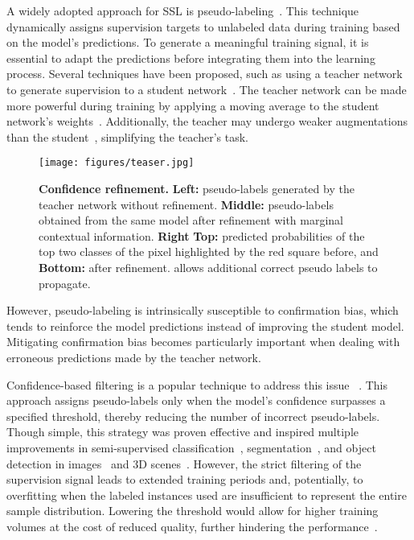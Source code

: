 \documentclass{article}
\renewcommand{\cite}[1]{\citep{#1}}
\begin{document}
A widely adopted approach for SSL is pseudo-labeling~\cite{lee2013pseudolabel,Arazo2020PseudoLabelingAC}. This technique dynamically assigns supervision targets to unlabeled data during training based on the model's predictions.  To generate a meaningful training signal, it is essential to adapt the predictions before integrating them into the learning process. Several techniques have been proposed, such as using a teacher network to generate supervision to a student network~\cite{hinton2015distilling}. The teacher network can be made more powerful during training by applying a moving average to the student network's weights~\cite{tarvainen2017meanteacher}. Additionally, the teacher may undergo weaker augmentations than the student~\cite{berthelot2019mixmatch}, simplifying the teacher's task.

\begin{figure}
	\centering	\texttt{[image: figures/teaser.jpg]} 
 \vspace{-.1cm}
	\caption{
 \textbf{Confidence refinement.} \textbf{Left:} pseudo-labels generated by the teacher network without refinement. \textbf{Middle:} pseudo-labels obtained from the same model after refinement with marginal contextual information. \textbf{Right} \textbf{Top:} predicted probabilities of the top two classes of the pixel highlighted by the red square before, and \textbf{Bottom:}  after refinement. \methodname{} allows additional correct pseudo labels to propagate.}
 \vspace{-0.5cm}
	\label{fig:teaser}
\end{figure}

However, pseudo-labeling is intrinsically susceptible to confirmation bias, which tends to reinforce the model predictions instead of improving the student model. Mitigating confirmation bias becomes particularly important when dealing with erroneous predictions made by the teacher network.

Confidence-based filtering is a popular technique to address this issue ~\cite{sohn2020fixmatch}. This approach assigns pseudo-labels only when the model's confidence surpasses a specified threshold, thereby reducing the number of incorrect pseudo-labels. Though simple, this strategy was proven effective and inspired multiple improvements in  semi-supervised classification~\cite{zhang2021flexmatch,ups}, segmentation~\cite{wang2022semi}, and object detection in images~\cite{sohn2020simple,liu2021unbiased} and 3D scenes~\cite{zhao2020sess,wang20203dioumatch}. 
However, the strict filtering of the supervision signal leads to extended training periods and, potentially, to overfitting when the labeled instances used are insufficient to represent the entire sample distribution. Lowering the threshold would allow for higher training volumes at the cost of reduced quality, further hindering the performance~\cite{sohn2020fixmatch}.
\end{document}
